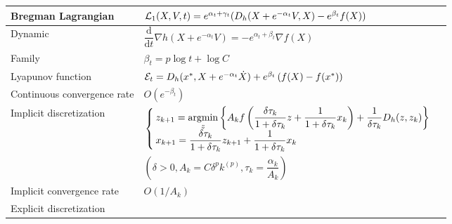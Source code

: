 \begin{table}[ht]
    \centering
    \begin{tabular}{|l|l|}
        \hline
        Bregman Lagrangian          & $\mathcal{L}_1(X,V,t) = e^{\alpha_t+\gamma_t}(D_h(X+e^{-\alpha_t}V, X)- e^{\beta_t}f(X))$                                                                                           \\
        \hline
        Dynamic                     & $\dfrac{\mathrm{d}}{\mathrm{d}t}\nabla h(X + e^{-\alpha_t}V) = -e^{\alpha_t+\beta_t}\nabla f(X)$                                                                           \\
        \hline
        Family                      & $\beta_t = p\log t + \log C$                                                                                                                                               \\
        \hline
        Lyapunov function           & $\mathcal{E}_t = D_h(x^*, X + e^{-\alpha_t}\dot{X}) + e^{\beta_t}\left(f(X) - f(x^*)\right)$                                                                                        \\
        \hline
        Continuous convergence rate & $O\left(e^{-\beta_t}\right)$                                                                                                                                               \\
        \hline
        \multirow{2}{*}{Implicit discretization }
                                    & $\begin{cases}
                                               z_{k+1} = \operatorname*{argmin}\limits_{z}\left\{A_k f\left(\dfrac{\delta\tau_k}{1+\delta\tau_k}z + \dfrac{1}{1+\delta\tau_k}x_k \right) + \dfrac{1}{\delta\tau_k}D_h(z, z_{k})\right\} \\
                                               x_{k+1} = \dfrac{\delta\tau_k}{1+\delta\tau_k}z_{k+1} + \dfrac{1}{1+\delta\tau_k}x_k
                                           \end{cases}$ \\

                                    & $(\delta > 0, A_k = C\delta^pk^{(p)}, \tau_k = \dfrac{\alpha_k}{A_k})$                                                                                                     \\
        \hline
        Implicit convergence rate   & $O\left(1/A_k\right)$                                                                                                                                                      \\
        \hline
        \multirow{4}{*}{Explicit discretization }


\end{tabular}
\end{table}
